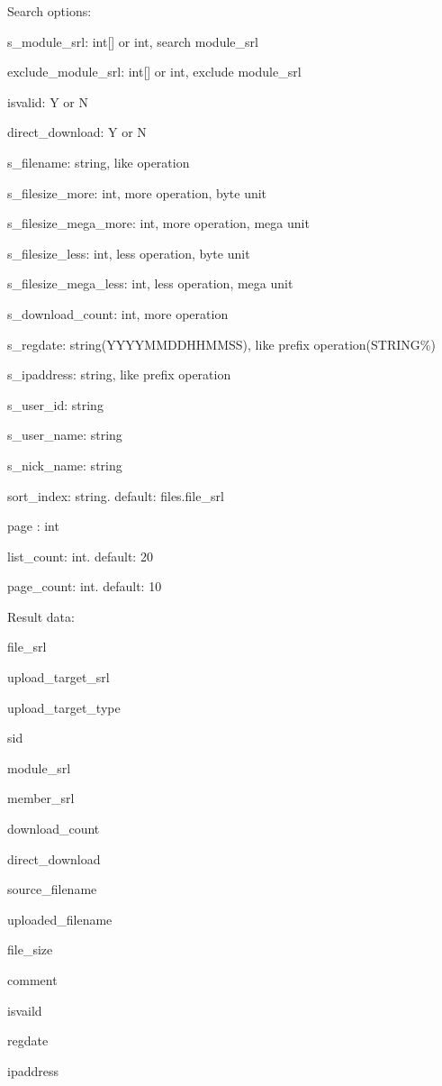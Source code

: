\begin{DoxyPre}
Search options:
\begin{DoxyItemize}
\item s\_module\_srl:          int[] or int, search module\_srl
\item exclude\_module\_srl:    int[] or int, exclude module\_srl
\item isvalid:               Y or N
\item direct\_download:       Y or N
\item s\_filename:            string, like operation
\item s\_filesize\_more:       int, more operation, byte unit
\item s\_filesize\_mega\_more:  int, more operation, mega unit
\item s\_filesize\_less:       int, less operation, byte unit
\item s\_filesize\_mega\_less:  int, less operation, mega unit
\item s\_download\_count:      int, more operation
\item s\_regdate:             string(YYYYMMDDHHMMSS), like prefix operation(STRING\%)
\item s\_ipaddress:           string, like prefix operation
\item s\_user\_id:             string
\item s\_user\_name:           string
\item s\_nick\_name:           string
\item sort\_index:            string. default: files.file\_srl
\item page :                 int
\item list\_count:            int. default: 20
\item page\_count:            int. default: 10
\end{DoxyItemize}\end{DoxyPre}



\begin{DoxyPre}Result data:
\begin{DoxyItemize}
\item file\_srl
\item upload\_target\_srl
\item upload\_target\_type
\item sid
\item module\_srl
\item member\_srl
\item download\_count
\item direct\_download
\item source\_filename
\item uploaded\_filename
\item file\_size
\item comment
\item isvaild
\item regdate
\item ipaddress
\end{DoxyItemize}\end{DoxyPre}



